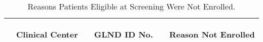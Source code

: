 \documentclass[dvips,10pt]{article}
\begin{document}
\clearpage
\begin{table}[t]
\caption
{ Reasons Patients Eligible at Screening Were Not Enrolled. }
\begin{center}
\begin{tabular}{ @{}l@{}
@{}l@{}@{}p{1.5em}@{}@{}c@{}@{}p{1.5em}@{}@{}l@{}
}
\hline

& \parbox{6em}{\begin{center}Clinical Center\end{center}} && \parbox{6em}{\begin{center}GLND ID No.\end{center}} && \parbox{6em}{\begin{center}Reason Not Enrolled\end{center}} \\

\hline


\end{tabular}
\end{center}
\end{table}
\end{document}
